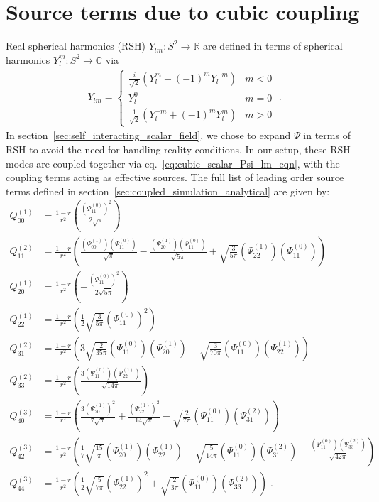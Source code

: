 \documentclass[reprint,aps,physrev,superscriptaddress,10pt,notitlepage,prd,nofootinbib,onecolumn]{revtex4-2}
\newcommand{\sref}[1]{section~\ref{#1}}
\begin{document}
\section{Source terms due to cubic coupling}
\label{sec:rsh_couplings}

Real spherical harmonics (RSH) $Y_{lm} : S^2 \to \mathbb{R}$ are defined in terms of spherical harmonics $Y_l^m : S^2 \to \mathbb{C}$ via
\begin{align}
  Y_{lm} =
  \begin{cases}
    \frac{i}{\sqrt{2}} (Y_l^m - (-1)^m Y_l^{-m}) & m < 0 \\
    Y_l^0 & m = 0 \\
    \frac{1}{\sqrt{2}} (Y_l^{-m} + (-1)^m Y_l^m) & m > 0 
  \end{cases}
  \;.
\end{align}
In \sref{sec:self_interacting_scalar_field}, we chose to expand $\Psi$ in terms of RSH to avoid the need for handling reality conditions.
In our setup, these RSH modes are coupled together via eq.~\eqref{eq:cubic_scalar_Psi_lm_eqn}, with the coupling terms acting as effective sources.
The full list of leading order source terms defined in \sref{sec:coupled_simulation_analytical} are given by:
\begin{align}
  \label{eq:Q_lm_leading_order}
  Q_{00}^{(1)} & = \frac{1-r}{r^2} \left( \frac{(\Psi^{(0)}_{11})^2}{2 \sqrt{\pi }} \right) \nonumber \\
  Q_{11}^{(2)} & = \frac{1-r}{r^2} \left( \frac{(\Psi^{(1)}_{00}) (\Psi^{(0)}_{11})}{\sqrt{\pi }}-\frac{(\Psi^{(1)}_{20}) (\Psi^{(0)}_{11})}{\sqrt{5 \pi }}+\sqrt{\frac{3}{5 \pi }} (\Psi^{(1)}_{22}) (\Psi^{(0)}_{11}) \right) \nonumber \\
  Q_{20}^{(1)} & = \frac{1-r}{r^2} \left( -\frac{(\Psi^{(0)}_{11})^2}{2 \sqrt{5 \pi }} \right) \nonumber \\
  Q_{22}^{(1)} &= \frac{1-r}{r^2} \left( \frac{1}{2} \sqrt{\frac{3}{5 \pi }} (\Psi^{(0)}_{11})^2 \right) \nonumber \\
  Q_{31}^{(2)} & = \frac{1-r}{r^2} \left( 3 \sqrt{\frac{2}{35 \pi }} (\Psi^{(0)}_{11}) (\Psi^{(1)}_{20})-\sqrt{\frac{3}{70 \pi }} (\Psi^{(0)}_{11}) (\Psi^{(1)}_{22}) \right) \nonumber \\
  Q_{33}^{(2)} & = \frac{1-r}{r^2} \left( \frac{3 (\Psi^{(0)}_{11}) (\Psi^{(1)}_{22})}{\sqrt{14 \pi }} \right) \nonumber \\
  Q_{40}^{(3)} & = \frac{1-r}{r^2} \left( \frac{3 (\Psi^{(1)}_{20})^2}{7 \sqrt{\pi }}+\frac{(\Psi^{(1)}_{22})^2}{14 \sqrt{\pi }}-\sqrt{\frac{2}{7 \pi }} (\Psi^{(0)}_{11}) (\Psi^{(2)}_{31}) \right) \nonumber \\
  Q_{42}^{(3)} & = \frac{1-r}{r^2} \left( \frac{1}{7} \sqrt{\frac{15}{\pi }} (\Psi^{(1)}_{20}) (\Psi^{(1)}_{22})+\sqrt{\frac{5}{14 \pi }} (\Psi^{(0)}_{11}) (\Psi^{(2)}_{31})-\frac{(\Psi^{(0)}_{11}) (\Psi^{(2)}_{33})}{\sqrt{42 \pi }} \right) \nonumber \\
  Q_{44}^{(3)} & = \frac{1-r}{r^2} \left( \frac{1}{2} \sqrt{\frac{5}{7 \pi }} (\Psi^{(1)}_{22})^2+\sqrt{\frac{2}{3 \pi }} (\Psi^{(0)}_{11}) (\Psi^{(2)}_{33}) \right) \;.
\end{align}
\end{document}
